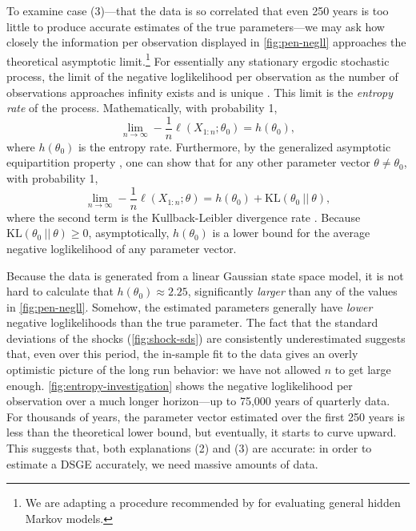 \documentclass[11pt]{article}
\begin{document}
To examine case (3)---that the data is so correlated that even 250 years
is too little to produce accurate estimates of the true parameters---we
may ask how closely the information per observation displayed in
\autoref{fig:pen-negll} approaches the theoretical asymptotic
limit.\footnote{We are adapting a procedure recommended by \citet{Andy-Fraser-on-HMMs} for evaluating general hidden Markov models.}
For essentially any stationary ergodic stochastic process, the limit of
the negative loglikelihood per observation as the number of observations
approaches infinity exists and is unique \citep{Gray-entropy-2nd}. This
limit is the \emph{entropy rate} of the process. Mathematically, with
probability 1, \[
\lim_{n\rightarrow\infty} -\frac{1}{n}\ell(X_{1:n}; \theta_0) = h(\theta_0),
\] where \(h(\theta_0)\) is the entropy rate. Furthermore, by the
generalized asymptotic equipartition property
\citep{Algoet-and-Cover-on-AEP}, one can show that for any other
parameter vector \(\theta \neq \theta_0\), with probability 1, \[
\lim_{n\rightarrow\infty} -\frac{1}{n}\ell(X_{1:n}; \theta) = h(\theta_0) + \mathrm{KL}(\theta_0\ ||\ \theta),
\] where the second term is the Kullback-Leibler divergence rate
\citep{Gray-entropy-2nd}. Because
\(\mathrm{KL}(\theta_0\ ||\ \theta) \geq 0\), asymptotically,
\(h(\theta_0)\) is a lower bound for the average negative loglikelihood
of any parameter vector.

Because the data is generated from a linear Gaussian state space model,
it is not hard to calculate that \(h(\theta_0) \approx 2.25\),
significantly \emph{larger} than any of the values in
\autoref{fig:pen-negll}. Somehow, the estimated parameters generally
have \emph{lower} negative loglikelihoods than the true parameter. The
fact that the standard deviations of the shocks
(\autoref{fig:shock-sds}) are consistently underestimated suggests that,
even over this period, the in-sample fit to the data gives an overly
optimistic picture of the long run behavior: we have not allowed \(n\)
to get large enough. \autoref{fig:entropy-investigation} shows the
negative loglikelihood per observation over a much longer horizon---up
to 75,000 years of quarterly data. For thousands of years, the parameter
vector estimated over the first 250 years is less than the theoretical
lower bound, but eventually, it starts to curve upward. This suggests
that, both explanations (2) and (3) are accurate: in order to estimate a
DSGE accurately, we need massive amounts of data.
\end{document}

